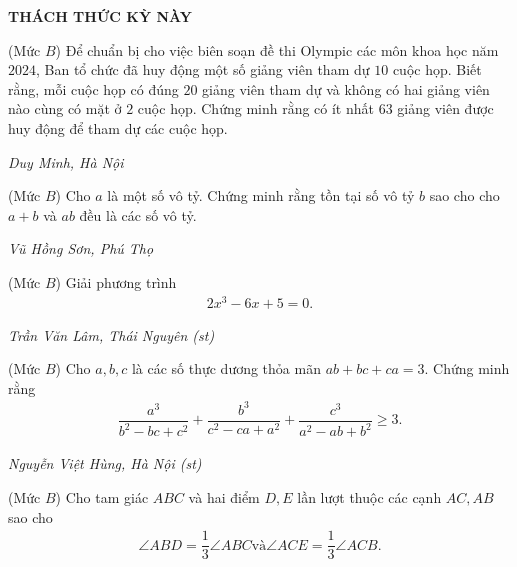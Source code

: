 \begin{center}
	\vspace*{-5pt}
	\textbf{\color{thachthuctoanhoc}\color{thachthuctoanhoc}\color{thachthuctoanhoc}\color{thachthuctoanhoc}\color{thachthuctoanhoc}THÁCH THỨC KỲ NÀY}
	\vspace*{-5pt}
\end{center}
\begin{multicols}{2}
	\setlength{\abovedisplayskip}{4pt}
	\setlength{\belowdisplayskip}{4pt}
	{}
	(Mức $B$) Để chuẩn bị cho việc biên soạn đề thi Olympic các môn khoa học năm $2024$, Ban tổ chức đã huy động một số giảng viên tham dự $10$ cuộc họp. Biết rằng, mỗi cuộc họp có đúng $20$ giảng viên tham dự và không có hai giảng viên nào cùng có mặt ở $2$ cuộc họp. Chứng minh rằng có ít nhất $63$ giảng viên được huy động để tham dự các cuộc họp.
	\begin{flushright}
		\textit{Duy Minh, Hà Nội}
	\end{flushright}
	{}
	(Mức $B$) Cho $a$ là một số vô tỷ. Chứng minh rằng tồn tại số vô tỷ $b$ sao cho cho $a+b$ và $ab$ đều là các số vô tỷ.
	\begin{flushright}
		\textit{Vũ Hồng Sơn, Phú Thọ}
	\end{flushright}
	{}
	(Mức $B$) Giải phương trình
	\begin{align*}
		2x^3-6x+5=0.
	\end{align*}
	\begin{flushright}
		\textit{Trần Văn Lâm, Thái Nguyên (st)}
	\end{flushright}
	{}
	(Mức $B$) Cho $a, b, c$ là các số thực dương thỏa mãn $a b+b c+c a=3$. Chứng minh rằng
	\begin{align*}
		\dfrac{a^3}{b^2\!-\!b c\!+\!c^2}\!+\!\dfrac{b^3}{c^2\!-\!c a\!+\!a^2}\!+\!\dfrac{c^3}{a^2\!-\!a b\!+\!b^2} \!\geq\! 3.
	\end{align*}
	\begin{flushright}
		\textit{Nguyễn Việt Hùng, Hà Nội (st)}
	\end{flushright}
	{}
	(Mức $B$) Cho tam giác $ABC$ và hai điểm $D, E$ lần lượt thuộc các cạnh $AC, AB$ sao cho
	\begin{align*}
		\angle{A B D}=\dfrac{1}{3} \angle{A B C} \text{và} \angle{A C E}=\dfrac{1}{3} \angle{A C B}.
	\end{align*}

\end{multicols}
